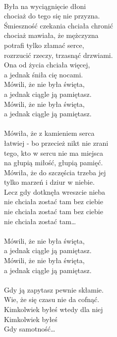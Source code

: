 \begin{text}
\vin \\
Była na wyciągnięcie dłoni\\
chociaż do tego się nie przyzna.\\
Śmieszność czekania chciała chronić\\
chociaż mawiała, że mężczyzna\\

potrafi tylko złamać serce,\\
rozrzucić rzeczy, trzasnąć drzwiami.\\
Ona od życia chciała więcej,\\
a jednak śniła cię nocami.\\

\vin Mówili, że nie była święta,\\
\vin a jednak ciągle ją pamiętasz.\\
\vin Mówili, że nie była święta,\\
\vin a jednak ciągle ją pamiętasz.\\

\vin \\
Mówiła, że z kamieniem serca\\
łatwiej - bo przecież nikt nie zrani\\
tego, kto w sercu nie ma miejsca\\
na głupią miłość, głupią pamięć.\\

Mówiła, że do szczęścia trzeba jej\\
tylko marzeń i dziur w niebie.\\
Lecz gdy dotknęła wreszcie nieba\\
nie chciała zostać tam bez ciebie\\
nie chciała zostać tam bez ciebie\\
nie chciała zostać tam…\\
\vin\\

\vin Mówili, że nie była święta,\\
\vin a jednak ciągle ją pamiętasz.\\
\vin Mówili, że nie była święta,\\
\vin a jednak ciągle ją pamiętasz.\\
\vin\\

Gdy ją zapytasz pewnie skłamie.\\
Wie, że się czasu nie da cofnąć.\\
Kimkolwiek byłeś wtedy dla niej\\
Kimkolwiek byłeś\\
Gdy samotność…\\
\vin\\


\end{text}
